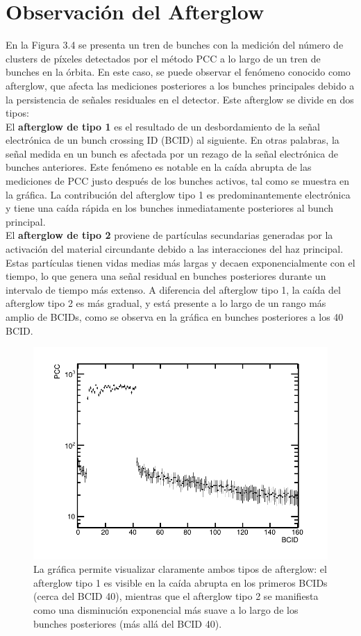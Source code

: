\section{Observación del Afterglow}

En la Figura 3.4 se presenta un tren de bunches con la medición del número de clusters de píxeles detectados por el método PCC a lo largo de un tren de bunches en la órbita. En este caso, se puede observar el fenómeno conocido como afterglow, que afecta las mediciones posteriores a los bunches principales debido a la persistencia de señales residuales en el detector. Este afterglow se divide en dos tipos:\\

El \textbf{afterglow de tipo 1} es el resultado de un desbordamiento de la señal electrónica de un bunch crossing ID (BCID) al siguiente. En otras palabras, la señal medida en un bunch es afectada por un rezago de la señal electrónica de bunches anteriores. Este fenómeno es notable en la caída abrupta de las mediciones de PCC justo después de los bunches activos, tal como se muestra en la gráfica. La contribución del afterglow tipo 1 es predominantemente electrónica y tiene una caída rápida en los bunches inmediatamente posteriores al bunch principal.\\

El \textbf{afterglow de tipo 2} proviene de partículas secundarias generadas por la activación del material circundante debido a las interacciones del haz principal. Estas partículas tienen vidas medias más largas y decaen exponencialmente con el tiempo, lo que genera una señal residual en bunches posteriores durante un intervalo de tiempo más extenso. A diferencia del afterglow tipo 1, la caída del afterglow tipo 2 es más gradual, y está presente a lo largo de un rango más amplio de BCIDs, como se observa en la gráfica en bunches posteriores a los 40 BCID.\\

\begin{center}
  \begin{figure}[h!]
    \centering
    \includegraphics[width=.55\textwidth]{Chapter3/singleTrainNoFit.png}
    \caption[Gráfica de un tren]{La gráfica permite visualizar claramente ambos tipos de afterglow: el afterglow tipo 1 es visible en la caída abrupta en los primeros BCIDs (cerca del BCID 40), mientras que el afterglow tipo 2 se manifiesta como una disminución exponencial más suave a lo largo de los bunches posteriores (más allá del BCID 40).} 
    \label{Lumi_2022}
  \end{figure}
\end{center}

